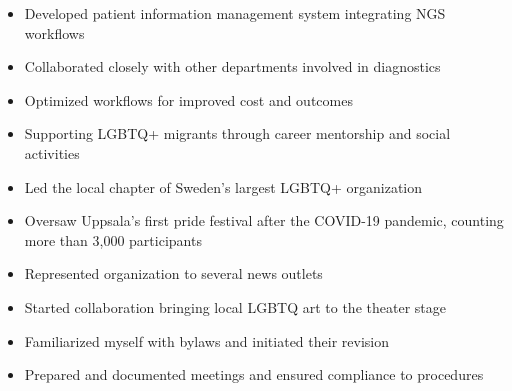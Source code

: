 \documentclass[9pt,a4paper,ragged2e,withhyper,normalphoto]{altacv}
\begin{document}
\begin{paracol}{2}
\begin{itemize}
\end{itemize}
\divider

\begin{itemize}
  \item Developed patient information management system integrating NGS workflows
  \item Collaborated closely with other departments involved in diagnostics
  \item Optimized workflows for improved cost and outcomes
\end{itemize}


\begin{itemize}
  \item Supporting LGBTQ+ migrants through career mentorship and social activities
\end{itemize}
\divider

\begin{itemize}
  \item Led the local chapter of Sweden's largest LGBTQ+ organization
  \item Oversaw Uppsala's first pride festival after the COVID-19 pandemic, counting more than 3,000 participants
  \item Represented organization to several news outlets
  \item Started collaboration bringing local LGBTQ art to the theater stage
\end{itemize}

\divider

\begin{itemize}
  \item Familiarized myself with bylaws and initiated their revision
  \item Prepared and documented meetings and ensured compliance to procedures
\end{itemize}
\divider

\divider

\divider


\end{paracol}
\end{document}
